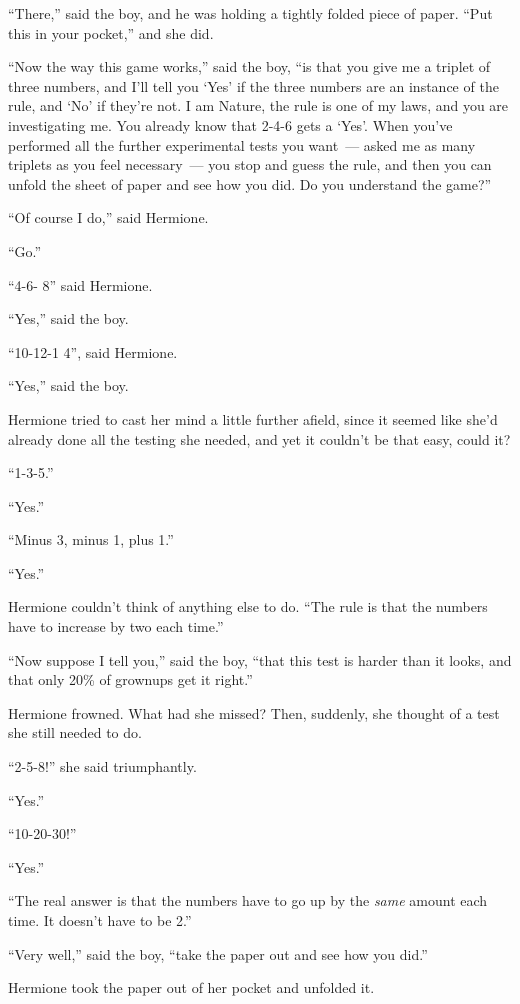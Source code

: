 ``There,'' said the boy, and he was holding a tightly folded piece of paper. ``Put this in your pocket,'' and she did.

``Now the way this game works,'' said the boy, ``is that you give me a triplet of three numbers, and I'll tell you `Yes' if the three numbers are an instance of the rule, and `No' if they're not. I am Nature, the rule is one of my laws, and you are investigating me. You already know that 2-4-6 gets a `Yes'. When you've performed all the further experimental tests you want~--- asked me as many triplets as you feel necessary~--- you stop and guess the rule, and then you can unfold the sheet of paper and see how you did. Do you understand the game?''

``Of course I do,'' said Hermione.

``Go.''

``4-6- 8'' said Hermione.

``Yes,'' said the boy.

``10-12-1 4'', said Hermione.

``Yes,'' said the boy.

Hermione tried to cast her mind a little further afield, since it seemed like she'd already done all the testing she needed, and yet it couldn't be that easy, could it?

``1-3-5.''

``Yes.''

``Minus 3, minus 1, plus 1.''

``Yes.''

Hermione couldn't think of anything else to do. ``The rule is that the numbers have to increase by two each time.''

``Now suppose I tell you,'' said the boy, ``that this test is harder than it looks, and that only 20\% of grownups get it right.''

Hermione frowned. What had she missed? Then, suddenly, she thought of a test she still needed to do.

``2-5-8!'' she said triumphantly.

``Yes.''

``10-20-30!''

``Yes.''

``The real answer is that the numbers have to go up by the \emph{same} amount each time. It doesn't have to be 2.''

``Very well,'' said the boy, ``take the paper out and see how you did.''

Hermione took the paper out of her pocket and unfolded it.

